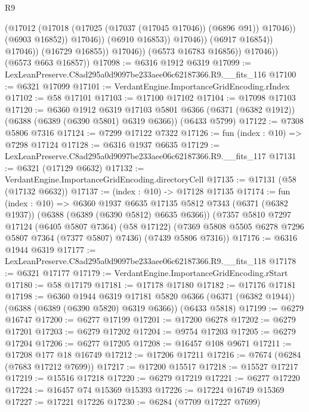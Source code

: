\begin{lexlean}{R9}
\begin{coremodule}
                                    (@17012
                                      (@17018 (@17025 (@17037 (@17045 @17046)) (@6896 @91)) @17046))
                                    (@6903 @16852))
                                  @17046))
                              (@6910 @16853))
                            @17046))
                        (@6917 @16854))
                      @17046))
                  (@16729 @16855))
                @17046))
            (@6573 @16783 @16856))
          @17046))
      (@6573 @663 @16857))
@17098 := @6316 @1912 @6319
@17099 := LexLeanPreserve.C8ad295a0d9097be233aee06c62187366.R9.__fits_116
@17100 := @6321 @17099
@17101 := VerdantEngine.ImportanceGridEncoding.rIndex
@17102 := @58 @17101
@17103 := @17100 @17102
@17104 := @17098 @17103
@17120 := @6360
    @1912
    @6319
    @17103
    @5801
    @6366
    (@6371 (@6382 @1912))
    (@6388 (@6389 (@6390 @5801) @6319 @6366))
    (@6433 @5799)
@17122 := @7308 @5806 @7316
@17124 := @7299 @17122 @7322
@17126 := fun (index : @10) => @7298 @17124
@17128 := @6316 @1937 @6635
@17129 := LexLeanPreserve.C8ad295a0d9097be233aee06c62187366.R9.__fits_117
@17131 := @6321 (@17129 @6632)
@17132 := VerdantEngine.ImportanceGridEncoding.directoryCell
@17135 := @17131 (@58 (@17132 @6632))
@17137 := (index : @10) -> @17128 @17135
@17174 := fun (index : @10) =>
  @6360
    @1937
    @6635
    @17135
    @5812
    @7343
    (@6371 (@6382 @1937))
    (@6388 (@6389 (@6390 @5812) @6635 @6366))
    (@7357
      @5810
      @7297
      @17124
      (@6405 @5807 @7364)
      (@58 @17122)
      (@7369 @5808 @5505 @6278 @7296 @5807 @7364 (@7377 @5807) @7436)
      (@7439 @5806 @7316))
@17176 := @6316 @1944 @6319
@17177 := LexLeanPreserve.C8ad295a0d9097be233aee06c62187366.R9.__fits_118
@17178 := @6321 @17177
@17179 := VerdantEngine.ImportanceGridEncoding.rStart
@17180 := @58 @17179
@17181 := @17178 @17180
@17182 := @17176 @17181
@17198 := @6360
    @1944
    @6319
    @17181
    @5820
    @6366
    (@6371 (@6382 @1944))
    (@6388 (@6389 (@6390 @5820) @6319 @6366))
    (@6433 @5818)
@17199 := @6279 @16747
@17200 := @6277 @17199
@17201 := @17200 @6278
@17202 := @6279 @17201
@17203 := @6279 @17202
@17204 := @9754 @17203
@17205 := @6279 @17204
@17206 := @6277 @17205
@17208 := @16457 @108 @9671
@17211 := @17208 @177 @18 @16749
@17212 := @17206 @17211
@17216 := @7674 (@6284 (@7683 @17212 @7699))
@17217 := @17200 @15517
@17218 := @15527 @17217
@17219 := @15516 @17218
@17220 := @6279 @17219
@17221 := @6277 @17220
@17224 := @16457 @74 @15369 @15393
@17226 := @17224 @16749 @15369
@17227 := @17221 @17226
@17230 := @6284 (@7709 @17227 @7699)

\end{coremodule}
\end{lexlean}
